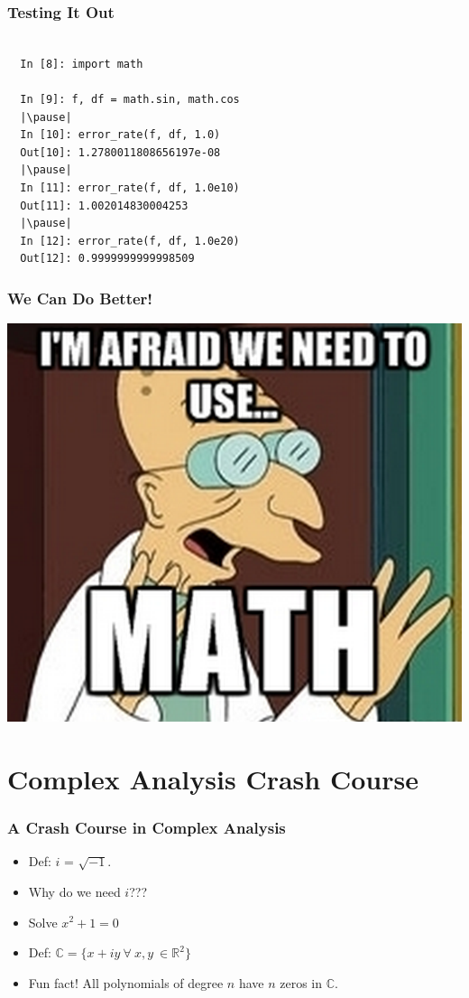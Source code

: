 \documentclass{beamer}
\def\R{\mathbb{R}}                     %
\def\C{\mathbb{C}}                     %
\begin{document}
\begin{frame}[fragile]
\frametitle{Testing It Out}

\begin{lstlisting}

  In [8]: import math

  In [9]: f, df = math.sin, math.cos
  |\pause|
  In [10]: error_rate(f, df, 1.0)
  Out[10]: 1.2780011808656197e-08
  |\pause|
  In [11]: error_rate(f, df, 1.0e10)
  Out[11]: 1.002014830004253
  |\pause|
  In [12]: error_rate(f, df, 1.0e20)
  Out[12]: 0.9999999999998509
\end{lstlisting}

\end{frame}

\begin{frame}
\frametitle{We Can Do Better!}
\pause
\begin{center}
  \includegraphics[scale=0.5]{use-math.png}
\end{center}

\end{frame}

\section{Complex Analysis Crash Course}

\begin{frame}
\frametitle{A Crash Course in Complex Analysis}

\begin{itemize}[<+->]
  \item Def: $i$ = $\sqrt{-1}$.
  \item Why do we need $i$???
  \item Solve $x^2 + 1 = 0$
  \item Def: $\C = \{x + iy \ \forall \ x,y \ \in \R^2 \}$
  \item Fun fact! All polynomials of degree $n$ have $n$ zeros in $\C$.
\end{itemize}


\end{frame}
\end{document}
